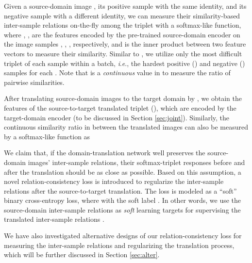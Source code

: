\documentclass[journal]{IEEEtran}
\newcommand{\ie}{\textit{i}.\textit{e}., }
\begin{document}
Given a source-domain image , its positive sample  with the same identity, and its negative sample  with a different identity,
we can measure their similarity-based inter-sample relations on-the-fly among the triplet with a softmax-like function,
{
}where , ,  are the features encoded by the pre-trained source-domain encoder  on the image samples , , , respectively, and  is the inner product between two feature vectors to measure their similarity.
Similar to \cite{hermans2017defense}, we utilize only the most difficult triplet of each sample  within a batch, \ie the hardest positive () and negative () samples for each . Note that  is a \emph{continuous} value in  to measure the ratio of pairwise similarities.

After translating source-domain images to the target domain by , we obtain the features of the source-to-target translated triplet
(), which are encoded by the target-domain encoder  (to be discussed in Section \ref{sec:joint}).
Similarly, the continuous similarity ratio in  between the translated images can also be measured by a softmax-like function as
{
}

We claim that, if the domain-translation network well preserves the source-domain images' inter-sample relations, their softmax-triplet responses before and after the translation should be as close as possible.
Based on this assumption, a novel relation-consistency loss is introduced to regularize the inter-sample relations after the source-to-target translation. The loss is modeled as a ``soft'' binary cross-entropy loss,
{
}where  with the soft label . In other words, we use the source-domain inter-sample relations  as \emph{soft} learning targets for supervising the translated inter-sample relations .

We have also investigated alternative designs of our relation-consistency loss for measuring the inter-sample relations and regularizing the translation process, which will be further discussed in Section \ref{sec:alter}.
\end{document}

